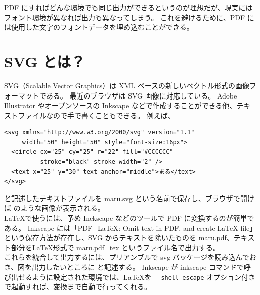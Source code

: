 PDF にすればどんな環境でも同じ出力ができるというのが理想だが、現実にはフォント環境が異なれば出力も異なってしまう。
これを避けるために、PDF には使用した文字のフォントデータを埋め込むことができる。
\section{SVG とは？}
SVG（Scalable Vector Graphics）は XML ベースの新しいベクトル形式の画像フォーマットである。
最近のブラウザは SVG 画像に対応している。
Adobe Illustrator やオープンソースの Inkscape などで作成することができる他、テキストファイルなので手で書くこともできる。
例えば、
\begin{mdframed}[roundcorner=0.50zw,leftmargin=3.00zw,rightmargin=3.00zw,skipabove=0.40zw,skipbelow=0.40zw,innertopmargin=4.00pt,innerbottommargin=4.00pt,innerleftmargin=5.00pt,innerrightmargin=5.00pt,linecolor=gray!020,linewidth=0.50pt,backgroundcolor=gray!20]
\begin{verbatim}
<svg xmlns="http://www.w3.org/2000/svg" version="1.1"
     width="50" height="50" style="font-size:16px">
  <circle cx="25" cy="25" r="22" fill="#CCCCCC"
          stroke="black" stroke-width="2" />
  <text x="25" y="30" text-anchor="middle">まる</text>
</svg>
\end{verbatim}
\end{mdframed}
と記述したテキストファイルを maru.svg という名前で保存し、ブラウザで開けば  のような画像が表示される。\\

\LaTeX{}で使うには、予め Inckscape などのツールで PDF に変換するのが簡単である。\enlargethispage{+0.10zw}
Inkscape には「PDF+LaTeX: Omit text in PDF, and create LaTeX file」という保存方法が存在し、SVG からテキストを除いたものを maru.pdf、テキスト部分を\LaTeX{}形式で maru.pdf\_tex というファイル名で出力する。\\

これらを統合して出力するには、プリアンブルで svg パッケージを読み込んでおき、図を出力したいところに \verb`` と記述する。
Inkscape が inkscape コマンドで呼び出せるように設定された環境では、\LaTeX{}を \verb`--shell-escape` オプション付きで起動すれば、変換まで自動で行ってくれる。
